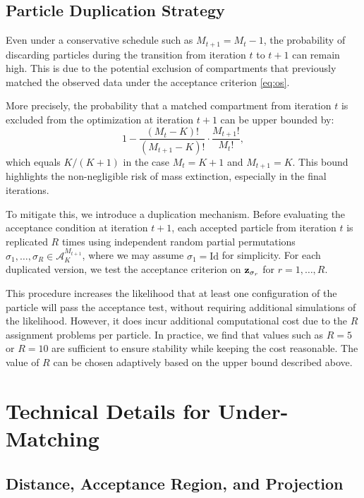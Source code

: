 \subsection{Particle Duplication Strategy}

Even under a conservative schedule such as \( M_{t+1} = M_t - 1 \), the probability of discarding particles during the transition from iteration \( t \) to \( t+1 \) can remain high. This is due to the potential exclusion of compartments that previously matched the observed data under the acceptance criterion \eqref{eq:os}.

More precisely, the probability that a matched compartment from iteration \( t \) is excluded from the optimization at iteration \( t+1 \) can be upper bounded by:
\[
1 - \frac{(M_t - K)!}{(M_{t+1} - K)!} \cdot \frac{M_{t+1}!}{M_t!},
\]
which equals \( K/(K+1) \) in the case \( M_t = K + 1 \) and \( M_{t+1} = K \). This bound highlights the non-negligible risk of mass extinction, especially in the final iterations.

To mitigate this, we introduce a duplication mechanism. Before evaluating the acceptance condition at iteration \( t+1 \), each accepted particle from iteration \( t \) is replicated \( R \) times using independent random partial permutations \( \sigma_1, \dots, \sigma_R \in \mathcal{A}_K^{M_{t+1}} \), where we may assume \( \sigma_1 = \mathrm{Id} \) for simplicity. For each duplicated version, we test the acceptance criterion on \( \mathbf{z}_{\sigma_r} \) for \( r = 1, \dots, R \).

This procedure increases the likelihood that at least one configuration of the particle will pass the acceptance test, without requiring additional simulations of the likelihood. However, it does incur additional computational cost due to the \( R \) assignment problems per particle. In practice, we find that values such as \( R = 5 \) or \( R = 10 \) are sufficient to ensure stability while keeping the cost reasonable. The value of \( R \) can be chosen adaptively based on the upper bound described above.

\section{Technical Details for Under-Matching}
\label{appendix_um}

\subsection{Distance, Acceptance Region, and Projection}

